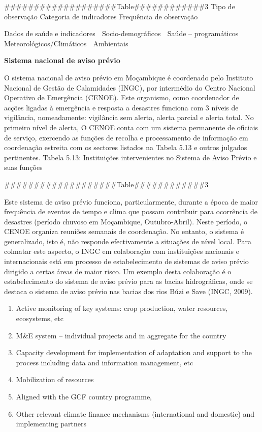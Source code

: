 \documentclass[
]{book}
\begin{document}
\#\#\#\#\#\#\#\#\#\#\#\#\#\#\#\#\#\#\#Table\#\#\#\#\#\#\#\#\#\#\#\#3
Tipo de observação Categoria de indicadores Frequência de observação

Dados de saúde e indicadores  Socio-demográficos
 Saúde -- programáticos
 Meteorológicos/Climáticos
 Ambientais

\textbf{Sistema nacional de aviso prévio}

O sistema nacional de aviso prévio em Moçambique é coordenado pelo Instituto Nacional de Gestão de Calamidades (INGC), por intermédio do Centro Nacional Operativo de Emergência (CENOE). Este organismo, como coordenador de acções ligadas à emergência e resposta a desastres funciona com 3 níveis de vigilância, nomeadamente: vigilância sem alerta, alerta parcial e alerta total. No primeiro nível de alerta, O CENOE conta com um sistema permanente de oficiais de serviço, exercendo as funções de recolha e processamento de informação em coordenação estreita com os sectores listados na Tabela 5.13 e outros julgados pertinentes.
Tabela 5.13: Instituições intervenientes no Sistema de Aviso Prévio e suas funções

\#\#\#\#\#\#\#\#\#\#\#\#\#\#\#\#\#\#\#Table\#\#\#\#\#\#\#\#\#\#\#\#3

Este sistema de aviso prévio funciona, particularmente, durante a época de maior frequência de eventos de tempo e clima que possam contribuir para ocorrência de desastres (período chuvoso em Moçambique, Outubro-Abril). Neste período, o CENOE organiza reuniões semanais de coordenação. No entanto, o sistema é generalizado, isto é, não responde efectivamente a situações de nível local. Para colmatar este aspecto, o INGC em colaboração com instituições nacionais e internacionais está em processo de estabelecimento de sistemas de aviso prévio dirigido a certas áreas de maior risco. Um exemplo desta colaboração é o estabelecimento do sistema de aviso prévio para as bacias hidrográficas, onde se destaca o sistema de aviso prévio nas bacias dos rios Búzi e Save (INGC, 2009).

\begin{enumerate}
\def\labelenumi{\roman{enumi}.}
\setcounter{enumi}{2}
\item
  Active monitoring of key systems: crop production, water resources, ecosystems, etc
\item
  M\&E system -- individual projects and in aggregate for the country
\item
  Capacity development for implementation of adaptation and support to the process including data and information management, etc
\item
  Mobilization of resources
\item
  Aligned with the GCF country programme,
\item
  Other relevant climate finance mechanisms (international and domestic) and implementing partners
\end{enumerate}
\end{document}
